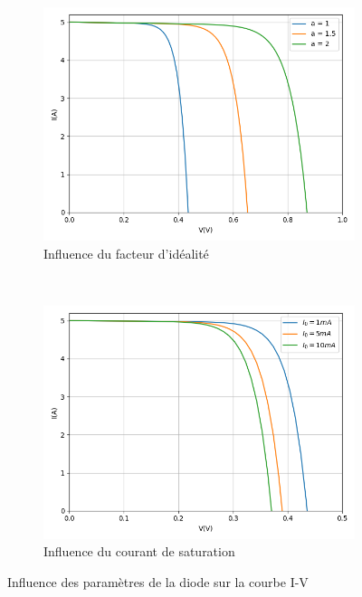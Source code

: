 \begin{figure}[h]
  \begin{subfigure}[b]{0.48\textwidth}
    \begin{center}
      \includegraphics[width=\textwidth]{resources/ainf.png}
      \caption{Influence du facteur d'idéalité}
    \end{center}
  \end{subfigure}
  ~
  \begin{subfigure}[b]{0.48\textwidth}
    \begin{center}
      \includegraphics[width=\textwidth]{resources/i0inf.png}
      \caption{Influence du courant de saturation}
    \end{center}
  \end{subfigure}
  \caption{Influence des paramètres de la diode sur la courbe I-V}
  \label{fig:dinf}

\end{figure}
  
